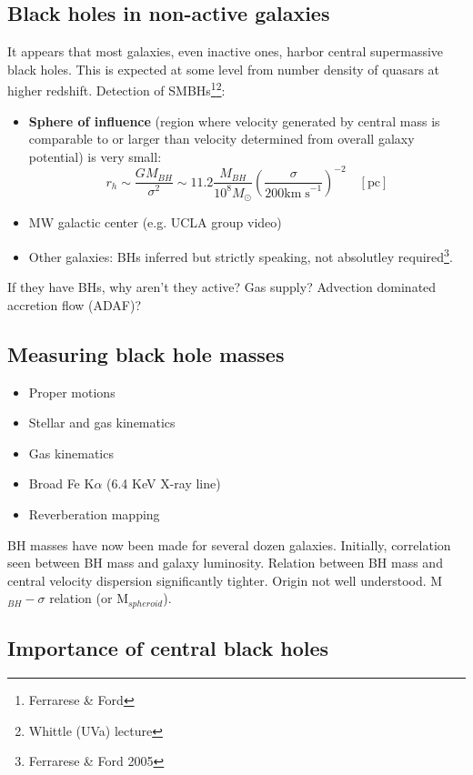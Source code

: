\documentclass{article}
\begin{document}
\subsection{Black holes in non-active galaxies}
It appears that most galaxies, even inactive ones, harbor central
supermassive black holes. This is expected at some level from number density
of quasars at higher redshift.
Detection of SMBHs\footnote{Ferrarese \& Ford}\footnote{Whittle (UVa) lecture}:
\begin{itemize}
    \item \textbf{Sphere of influence} (region where velocity generated by
        central mass is comparable to or larger than velocity determined
        from overall galaxy potential) is very small:
        \[
            r_{h} \sim \frac{GM_{BH}}{\sigma^{2}} \sim
            11.2\frac{M_{BH}}{10^{8}M_{\odot}}\left(
            \frac{\sigma}{200\mathrm{km\;s}^{-1}}\right)^{-2}\quad
            \left[\mathrm{pc}\right]
            \]
    \item MW galactic center (e.g. UCLA group video)
    \item Other galaxies: BHs inferred but strictly speaking, not absolutley
        required\footnote{Ferrarese \& Ford 2005}.
\end{itemize}
If they have BHs, why aren't they active? Gas supply? Advection dominated
accretion flow (ADAF)?

\subsection{Measuring black hole masses}
\begin{itemize}
    \item Proper motions
    \item Stellar and gas kinematics
    \item Gas kinematics
    \item Broad Fe K$\alpha$ (6.4 KeV X-ray line)
    \item Reverberation mapping
\end{itemize}
BH masses have now been made for several dozen galaxies. Initially, correlation
seen between BH mass and galaxy luminosity. Relation between BH mass and
central velocity dispersion significantly tighter. Origin not well understood.
M$_{BH}-\sigma$ relation (or M$_{spheroid}$).

\subsection{Importance of central black holes}
\end{document}
